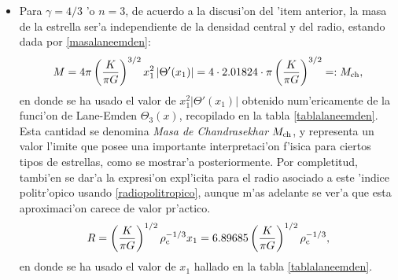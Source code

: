 \begin{itemize}
 \item Para $\gamma=4/3$ 'o $n=3$, de acuerdo a la discusi'on del 'item anterior, la masa de la estrella ser'a independiente de la densidad central y del radio, estando dada por \eqref{masalaneemden}:
\begin{align}\label{masa4/3}
 M=4\pi\left(\frac{K}{\pi G}\right)^{3/2}x_1^2\left|\Theta'(x_1)\right|
 =4\cdot2.01824\cdot\pi\left(\frac{K}{\pi G}\right)^{3/2}=:M_{\rm ch},
\end{align}
en donde se ha usado el valor de $x_1^2\left|\Theta'(x_1)\right|$ obtenido num'ericamente de la funci'on de Lane-Emden $\Theta_3(x)$, recopilado en la tabla \ref{tablalaneemden}. Esta cantidad se denomina \emph{Masa de Chandrasekhar} $M_{\rm ch}$, y representa un valor l'imite que posee una importante interpretaci'on f'isica para ciertos tipos de estrellas, como se mostrar'a posteriormente.
 Por completitud, tambi'en se dar'a la expresi'on expl'icita para el radio asociado a este 'indice politr'opico usando \eqref{radiopolitropico}, aunque m'as adelante se ver'a que esta aproximaci'on carece de valor pr'actico.
\begin{align}\label{radio4/3}
 R=\left(\frac{K}{\pi G}\right)^{1/2}\rho_{\rm c}^{-1/3}x_1
 =6.89685\left(\frac{K}{\pi G}\right)^{1/2}\rho_{\rm c}^{-1/3},
\end{align}
en donde se ha usado el valor de $x_1$ hallado en la tabla \ref{tablalaneemden}.


\end{itemize}
